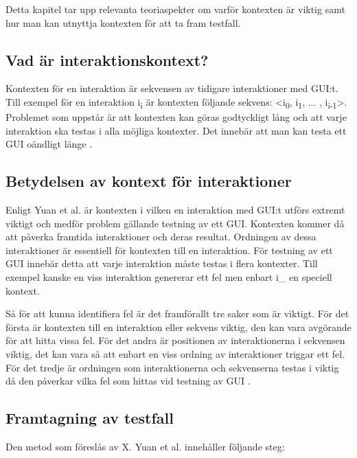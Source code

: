 Detta kapitel tar upp relevanta teoriaspekter om varför kontexten är viktig samt hur man kan utnyttja kontexten för att ta fram testfall.

\subsection{Vad är interaktionskontext?}

Kontexten för en interaktion är sekvensen av tidigare interaktioner med GUI:t. Till exempel för en interaktion i\textsubscript{i} är kontexten följande sekvens: <i\textsubscript{0}, i\textsubscript{1},  ... , i\textsubscript{i-1}>. Problemet som uppstår är att kontexten kan göras godtyckligt lång och att varje interaktion ska testas i alla möjliga kontexter. Det innebär att man kan testa ett GUI oändligt länge \cite{yuan2011gui}. 

\subsection{Betydelsen av kontext för interaktioner}

Enligt Yuan et al. \cite{yuan2011gui} är kontexten i vilken en interaktion med GUI:t utförs extremt viktigt och medför problem gällande testning av ett GUI. Kontexten kommer då att påverka framtida interaktioner och deras resultat. Ordningen av dessa interaktioner är essentiell för kontexten till en interaktion. För testning av ett GUI innebär detta att varje interaktion måste testas i flera kontexter. Till exempel kanske en viss interaktion genererar ett fel men enbart i_{} en speciell kontext.

Så för att kunna identifiera fel är det framförallt tre saker som är viktigt. För det första är kontexten till en interaktion eller sekvens viktig, den kan vara avgörande för att hitta vissa fel. För det andra är positionen av interaktionerna i sekvensen viktig, det kan vara så att enbart en viss ordning av interaktioner triggar ett fel. För det tredje är ordningen som interaktionerna och sekvenserna testas i viktig då den påverkar vilka fel som hittas vid testning av GUI \cite{yuan2011gui}.

\subsection{Framtagning av testfall}
\label{sec:testcase-holmberg}

Den metod som föreslås av X. Yuan et al. \cite{yuan2011gui} innehåller följande steg:

